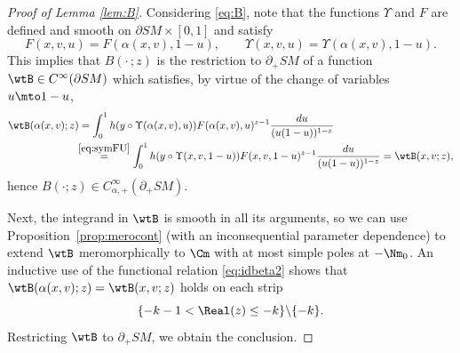  \label{sec:BetaFacts}

\begin{proof}[Proof of Lemma \ref{lem:B}] Considering \eqref{eq:B}, note that the functions $\Upsilon$ and $F$ are defined
and smooth on $\partial SM\times [0,1]$ and satisfy
\begin{equation}
F(x,v,u) = F(\alpha(x,v),1-u), \qquad \Upsilon (x,v,u) = \Upsilon (\alpha(x,v),1-u).
\label{eq:symFU}
\end{equation}
This implies that $B(\cdot\,; z)$ is the restriction to $\partial_+ SM$ of a function $\wtB\in C^\infty(\partial SM)$ which satisfies,
by virtue of the change of variables $u \mto 1-u$,
\begin{align*}
\wtB(\alpha(x,v); z) &= \int_0^1 h(y\circ\Upsilon(\alpha(x,v),u)) F(\alpha(x,v),u)^{z-1} \frac{du}{(u(1-u))^{1-z}} \\
&\!\!\stackrel{\eqref{eq:symFU}}{=} \int_0^1 h(y\circ\Upsilon(x,v,1-u)) F(x,v,1-u)^{z-1} \frac{du}{ (u(1-u))^{1-z}} = \wtB(x,v; z),
\end{align*}
hence $B(\cdot; z) \in C_{\alpha,+}^\infty(\partial_+ SM)$.

Next, the integrand in $\wtB$ is smooth in all its arguments, so we can use Proposition~\ref{prop:merocont} (with an
inconsequential parameter dependence) to extend $\wtB$ meromorphically to $\Cm$ with at most simple poles at $-\Nm_0$.
An inductive use of the functional relation \eqref{eq:idbeta2} shows that $\wtB(\alpha(x,v); z) = \wtB(x,v; z)$ holds on each strip
\[
\{-k-1<\Real(z)\le -k\}\backslash \{-k\}.
\]
Restricting $\wtB$ to $\partial_+ SM$, we obtain the conclusion.
\end{proof}

